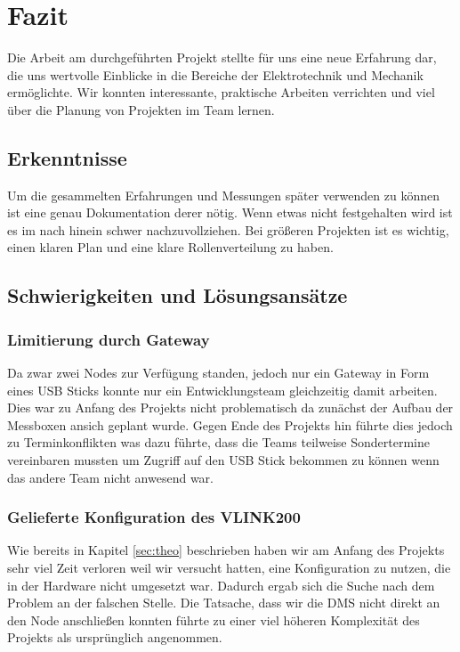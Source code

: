 \chapter{Fazit}
Die Arbeit am durchgeführten Projekt stellte für uns eine neue Erfahrung dar, die uns wertvolle Einblicke in die Bereiche der Elektrotechnik und Mechanik ermöglichte.
Wir konnten interessante, praktische Arbeiten verrichten und viel über die Planung von Projekten im Team lernen.
\label{cha:fazit}
\section{Erkenntnisse}
Um die gesammelten Erfahrungen und Messungen später verwenden zu können ist eine genau Dokumentation derer nötig.
Wenn etwas nicht festgehalten wird ist es im nach hinein schwer nachzuvollziehen.
Bei größeren Projekten ist es wichtig, einen klaren Plan und eine klare Rollenverteilung zu haben.


\section{Schwierigkeiten und L\"osungsans\"atze}
\label{sec:probleme}
\subsection{Limitierung durch Gateway}
Da zwar zwei Nodes zur Verfügung standen, jedoch nur ein Gateway in Form eines USB Sticks konnte nur ein Entwicklungsteam gleichzeitig damit arbeiten.
Dies war zu Anfang des Projekts nicht problematisch da zunächst der Aufbau der Messboxen ansich geplant wurde.
Gegen Ende des Projekts hin führte dies jedoch zu Terminkonflikten was dazu führte,
dass die Teams teilweise Sondertermine vereinbaren mussten um Zugriff auf den USB Stick bekommen zu können wenn das andere Team nicht anwesend war.

\subsection{Gelieferte Konfiguration des VLINK200}
Wie bereits in Kapitel \ref{sec:theo} beschrieben haben wir am Anfang des Projekts sehr viel Zeit verloren weil wir versucht hatten, eine Konfiguration zu nutzen, die in der Hardware nicht umgesetzt war.
Dadurch ergab sich die Suche nach dem Problem an der falschen Stelle.
Die Tatsache, dass wir die DMS nicht direkt an den Node anschließen konnten führte zu einer viel höheren Komplexität des Projekts als ursprünglich angenommen.


